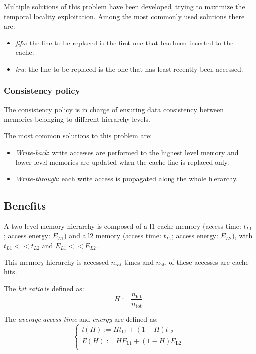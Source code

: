 \documentclass[11pt,a4paper,oneside]{memoir}
\begin{document}
Multiple solutions of this problem have been developed, trying to maximize
the temporal locality exploitation.
Among the most commonly used solutions there are:
\begin{itemize}
	\item \emph{\acl{fifo}}: the line to be replaced is the first
		one that has been inserted to the cache.
	\item \emph{\acl{lru}}: the line to be replaced is the one
		that has least recently been accessed.
\end{itemize}

\subsubsection{Consistency policy}
The consistency policy is in charge of ensuring data consistency between
memories belonging to different hierarchy levels.

The most common solutions to this problem are:
\begin{itemize}
	\item \emph{Write-back}: write accesses are performed to the highest
		level memory and lower level memories are updated when the cache
		line is replaced only.
	\item \emph{Write-through}: each write access is propagated along the
		whole hierarchy.
\end{itemize}

\subsection{Benefits}
A two-level memory hierarchy is composed of a \ac{l1} cache memory (access time:
$t_{L1}$; access energy: $E_{L1}$) and a \ac{l2} memory (access time: $t_{L2}$;
access energy: $E_{L2}$), with $t_{L1} << t_{L2}$ and $E_{L1} << E_{L2}$.

This memory hierarchy is accessed $n_{\text{tot}}$ times and $n_{\text{hit}}$
of these accesses are cache hits.

\bigskip
The \emph{hit ratio} is defined as: 
\begin{equation}
	H := \frac{n_\text{hit}}{n_{\text{tot}}}
\end{equation}

The \emph{average access time} and \emph{energy} are defined as:
\begin{equation}\label{eq:avg_acc}
	\begin{cases}
	\overline{t}(H) := H t_{\text{L1}} + (1 - H) t_{\text{L2}} \\
	\overline{E}(H) := H E_{\text{L1}} + (1 - H) E_{\text{L2}} \\
	\end{cases}
\end{equation}
\end{document}
